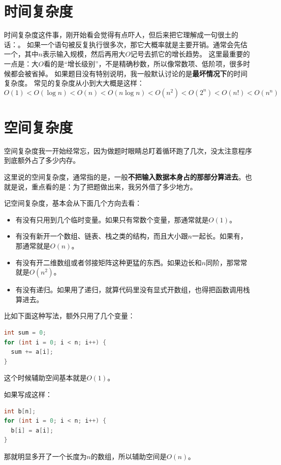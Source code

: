 \documentclass[b5paper,11pt]{article}
\begin{document}
\section{时间复杂度}
时间复杂度这件事，刚开始看会觉得有点吓人，但后来把它理解成一句很土的话：。
如果一个语句被反复执行很多次，那它大概率就是主要开销。通常会先估一个，其中$n$表示输入规模，然后再用大$O$记号去抓它的增长趋势。
这里最重要的一点是：大$O$看的是“增长级别”，不是精确秒数，所以像常数项、低阶项，很多时候都会被省掉。
如果题目没有特别说明，我一般默认讨论的是\textbf{最坏情况下}的时间复杂度。
常见的复杂度从小到大大概是这样：
$$O(1) < O(\log n) < O(n) < O(n \log n) < O(n^2) < O(2^n) < O(n!) < O(n^n)$$

\section{空间复杂度}
空间复杂度我一开始经常忘，因为做题时眼睛总盯着循环跑了几次，没太注意程序到底额外占了多少内存。

这里说的空间复杂度，通常指的是，一般\textbf{不把输入数据本身占的那部分算进去}。也就是说，重点看的是：为了把题做出来，我另外借了多少地方。

记空间复杂度，基本会从下面几个方向去看：
\begin{itemize}
  \item 有没有只用到几个临时变量。如果只有常数个变量，那通常就是$O(1)$。
  \item 有没有新开一个数组、链表、栈之类的结构，而且大小跟$n$一起长。如果有，那通常就是$O(n)$。
  \item 有没有开二维数组或者邻接矩阵这种更猛的东西。如果边长和$n$同阶，那常常就是$O(n^2)$。
  \item 有没有递归。如果用了递归，就算代码里没有显式开数组，也得把函数调用栈算进去。
\end{itemize}

比如下面这种写法，额外只用了几个变量：
\begin{lstlisting}[language=C]
int sum = 0;
for (int i = 0; i < n; i++) {
  sum += a[i];
}
\end{lstlisting}
这个时候辅助空间基本就是$O(1)$。

如果写成这样：
\begin{lstlisting}[language=C]
int b[n];
for (int i = 0; i < n; i++) {
  b[i] = a[i];
}
\end{lstlisting}
那就明显多开了一个长度为$n$的数组，所以辅助空间是$O(n)$。
\end{document}
